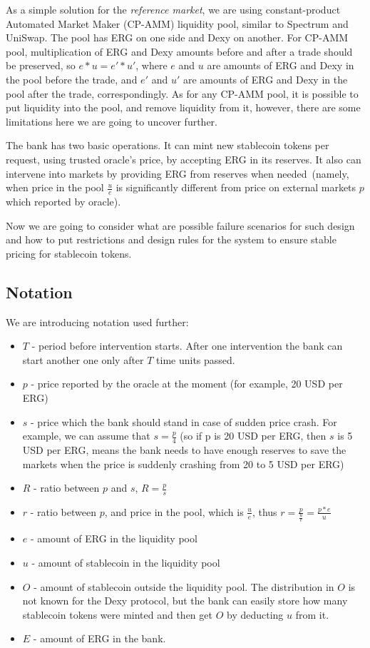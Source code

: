 \documentclass{article}   %
\newcommand{\bc}{ERG}
\newcommand{\stc}{stablecoin}
\newcommand{\sct}{stablecoin}
\newcommand{\dx}{Dexy}
\begin{document}
As a simple solution for the {\em reference market}, we are using constant-product Automated Market Maker (CP-AMM) liquidity pool, similar to Spectrum and UniSwap. The pool has \bc{} on one side and \dx{} on another. For CP-AMM pool, multiplication of \bc{} and \dx{} amounts before and after a trade should be preserved, so $e * u = e' * u'$, where $e$ and $u$ are amounts of \bc{} and \dx{} in the pool before the trade, and $e'$ and $u'$ are amounts of \bc{} and \dx{} in the pool after the trade, correspondingly. As for any CP-AMM pool, it is possible to put liquidity into the pool, and remove liquidity from it, however, there are some limitations here we are going to uncover further. 

The bank has two basic operations. It can mint new \sct{} tokens per request, using trusted oracle's price, by accepting \bc{} in its reserves. It also can intervene into markets by providing \bc{} from reserves when needed~(namely, when price in the pool $\frac{u}{e}$ is significantly different from price on external markets $p$ which reported by oracle).

Now we are going to consider what are possible failure scenarios for such design and how to put restrictions and design rules for the system to ensure stable pricing for \sct{} tokens. 

\subsection{Notation}

We are introducing notation used further:
\begin{itemize}
  \item{} $T$ - period before intervention starts. After one intervention the bank can start another one only after $T$ time units passed. 
  \item{} $p$ - price reported by the oracle at the moment (for example, 20 USD per ERG)
  \item{} $s$ - price which the bank should stand in case of sudden price crash. For example, we can assume that $s = \frac{p}{4}$ (so if p is 20 USD per ERG, then $s$ is 5 USD per ERG, means the bank needs to have enough reserves to save the markets when the price is suddenly crashing from 20 to 5 USD per ERG)
  \item{} $R$ - ratio between $p$ and $s$, $R = \frac{p}{s}$
  \item{} $r$ - ratio between $p$, and price in the pool, which is $\frac{u}{e}$, thus $r = \frac{p}{\frac{u}{e}} = \frac{p*e}{u}$
  \item{} $e$ - amount of \bc{} in the liquidity pool 
  \item{} $u$ - amount of \stc{} in the liquidity pool
  \item{} $O$ - amount of \stc{} outside the liquidity pool. The distribution in $O$ is not known for the \dx{} protocol, but the bank can easily store how many \sct{} tokens were minted and then get $O$ by deducting $u$ from it.
  \item{} $E$ - amount of \bc{} in the bank. 
\end{itemize}  
\end{document}
